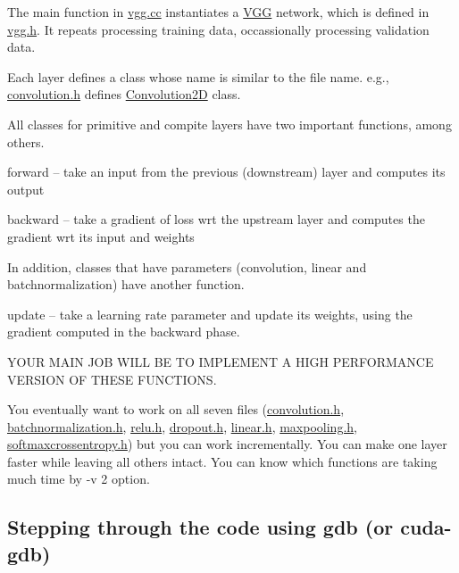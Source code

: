 The main function in \hyperlink{vgg_8cc}{vgg.\+cc} instantiates a \hyperlink{structVGG}{V\+GG} network, which is defined in \hyperlink{vgg_8h}{vgg.\+h}. It repeats processing training data, occassionally processing validation data.

Each layer defines a class whose name is similar to the file name. e.\+g., \hyperlink{convolution_8h}{convolution.\+h} defines \hyperlink{structConvolution2D}{Convolution2D} class.

All classes for primitive and compite layers have two important functions, among others.
\begin{DoxyItemize}
\item forward -- take an input from the previous (downstream) layer and computes its output
\item backward -- take a gradient of loss wrt the upstream layer and computes the gradient wrt its input and weights
\end{DoxyItemize}

In addition, classes that have parameters (convolution, linear and batchnormalization) have another function.


\begin{DoxyItemize}
\item update -- take a learning rate parameter and update its weights, using the gradient computed in the backward phase.
\end{DoxyItemize}



 Y\+O\+UR M\+A\+IN J\+OB W\+I\+LL BE TO I\+M\+P\+L\+E\+M\+E\+NT A H\+I\+GH P\+E\+R\+F\+O\+R\+M\+A\+N\+CE V\+E\+R\+S\+I\+ON OF T\+H\+E\+SE F\+U\+N\+C\+T\+I\+O\+NS. 



You eventually want to work on all seven files (\hyperlink{convolution_8h}{convolution.\+h}, \hyperlink{batchnormalization_8h}{batchnormalization.\+h}, \hyperlink{relu_8h}{relu.\+h}, \hyperlink{dropout_8h}{dropout.\+h}, \hyperlink{linear_8h}{linear.\+h}, \hyperlink{maxpooling_8h}{maxpooling.\+h}, \hyperlink{softmaxcrossentropy_8h}{softmaxcrossentropy.\+h}) but you can work incrementally. You can make one layer faster while leaving all others intact. You can know which functions are taking much time by -\/v 2 option.

\subsection*{Stepping through the code using gdb (or cuda-\/gdb) }

